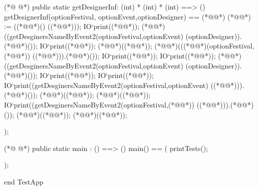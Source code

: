 \begin{vdmpp}[breaklines=true]
(*@
\label{getDesignerInf:186}
@*)
 public static getDesignerInf: (int) * (int) * (int) ==> ()
  getDesignerInf(optionFestival, optionEvent,optionDesigner) ==
  (*@\vdmnotcovered{(}@*) 
  (*@@*) := ((*@@*)() ((*@@*)));
  IO`print((*@@*));
   (*@@*)((getDesginersNameByEvent2(optionFestival,optionEvent) (optionDesigner)).(*@@*)());
   IO`print((*@@*));
   (*@@*)((*@@*));
   (*@@*)(((*@@*)(optionFestival,(*@@*)) ((*@@*))).(*@@*)());
   IO`print((*@@*));
   IO`print((*@@*));
   (*@@*)((getDesginersNameByEvent2(optionFestival,optionEvent) (optionDesigner)).(*@@*)());
   IO`print((*@@*));
   IO`print((*@@*));
   IO`print((getDesginersNameByEvent2(optionFestival,optionEvent) ((*@@*))).(*@@*)());
   (*@@*)((*@@*));
   (*@@*)((*@@*));
   IO`print((getDesginersNameByEvent2(optionFestival,(*@@*)) ((*@@*))).(*@@*)());
   (*@@*)((*@@*));
   (*@@*)((*@@*));
    
  );
  

(*@
\label{main:210}
@*)
public static main : () ==> ()
  main() ==
  (
   printTests();
  
  );

end TestApp
\end{vdmpp}
\bigskip

